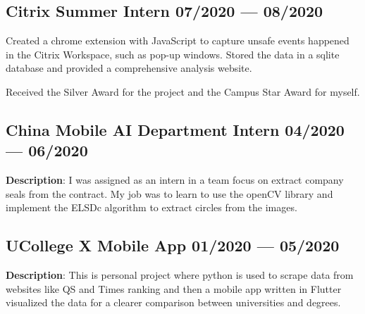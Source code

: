 \subsection{{
    Citrix Summer Intern
    \hfill 07/2020 --- 08/2020
}}
\begin{zitemize}
    \item   Created a chrome extension with JavaScript to capture unsafe events
            happened in the Citrix Workspace, such as pop-up windows. 
            Stored the data in a sqlite database and provided a comprehensive
            analysis website.
    \item   Received the Silver Award for the project and the Campus Star Award for myself.
\end{zitemize}

\subsection{{China Mobile AI Department Intern
    \hfill 04/2020 --- 06/2020}}
\begin{zitemize}
    \item \textbf{Description}: I was assigned as an intern in a team focus on
        extract company seals from the contract. My job was to learn to use the
        openCV library and implement the ELSDc algorithm to extract circles
        from the images.
\end{zitemize}

\subsection{{UCollege X Mobile App
    \hfill 01/2020 --- 05/2020}}
\begin{zitemize}
    \item \textbf{Description}: This is personal project where python is used
        to scrape data from websites like QS and Times ranking and then a mobile
        app written in Flutter visualized the data for a clearer comparison 
        between universities and degrees.
\end{zitemize}
